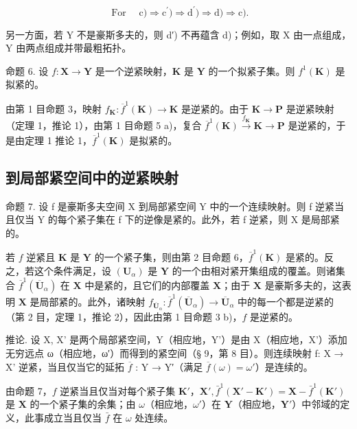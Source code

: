 \[
\text { For } \quad \mathrm{c}) \Longrightarrow \mathrm{c} ^ {\prime}) \Longrightarrow \mathrm{d} ^ {\prime}) \Longrightarrow \mathrm{d}) \Longrightarrow \mathrm{c}).
\]

另一方面，若 Y 不是豪斯多夫的，则 d′) 不再蕴含 d)；例如，取 X 由一点组成，Y 由两点组成并带最粗拓扑。

命题 6. 设 \(f: \mathbf{X} \to \mathbf{Y}\) 是一个逆紧映射，\(\mathbf{K}\) 是 \(\mathbf{Y}\) 的一个拟紧子集。则 \(f^1(\mathbf{K})\) 是拟紧的。

由第 1 目命题 3，映射 \(f_{\mathbf{K}}: \overline{f}^{1}(\mathbf{K}) \to \mathbf{K}\) 是逆紧的。由于 \(\mathbf{K} \to \mathbf{P}\) 是逆紧映射（定理 1，推论 1），由第 1 目命题 5 a)，复合 \(\overline{f}^{1}(\mathbf{K}) \xrightarrow{f_{\mathbf{K}}} \mathbf{K} \to \mathbf{P}\) 是逆紧的，于是由定理 1 推论 1，\(\overline{f}^{1}(\mathbf{K})\) 是拟紧的。

\subsection{到局部紧空间中的逆紧映射}

命题 7. 设 f 是豪斯多夫空间 X 到局部紧空间 Y 中的一个连续映射。则 f 逆紧当且仅当 Y 的每个紧子集在 f 下的逆像是紧的。此外，若 f 逆紧，则 X 是局部紧的。

若 \(f\) 逆紧且 \(\mathbf{K}\) 是 \(\mathbf{Y}\) 的一个紧子集，则由第 2 目命题 6，\(\overline{f}^{1}(\mathbf{K})\) 是紧的。反之，若这个条件满足，设 \((\mathbf{U}_{\alpha})\) 是 \(\mathbf{Y}\) 的一个由相对紧开集组成的覆盖。则诸集合 \(\overline{f}^{1}(\overline{\mathbf{U}}_{\alpha})\) 在 \(\mathbf{X}\) 中是紧的，且它们的内部覆盖 \(\mathbf{X}\)；由于 \(\mathbf{X}\) 是豪斯多夫的，这表明 \(\mathbf{X}\) 是局部紧的。此外，诸映射 \(f_{\overline{\mathbf{U}}_{\alpha}}: \overline{f}^{1}(\overline{\mathbf{U}}_{\alpha}) \to \overline{\mathbf{U}}_{\alpha}\) 中的每一个都是逆紧的（第 2 目，定理 1，推论 2），因此由第 1 目命题 3 b)，\(f\) 是逆紧的。

推论. 设 X, X' 是两个局部紧空间，Y（相应地，Y'）是由 X（相应地，X'）添加无穷远点 ω（相应地，ω′）而得到的紧空间（§ 9，第 8 目）。则连续映射 f: X → X' 逆紧，当且仅当它的延拓 \(\overline{f}\) : Y → Y′（满足 \(\overline{f}(\omega) = \omega'\)）是连续的。

由命题 7，\(f\) 逆紧当且仅当对每个紧子集 \(\mathbf{K}'\)，\(\mathbf{X}', \bar{f}^1(\mathbf{X}' - \mathbf{K}') = \mathbf{X} - \bar{f}^1(\mathbf{K}')\) 是 \(\mathbf{X}\) 的一个紧子集的余集；由 \(\omega\)（相应地，\(\omega'\)）在 \(\mathbf{Y}\)（相应地，\(\mathbf{Y}'\)）中邻域的定义，此事成立当且仅当 \(\bar{f}\) 在 \(\omega\) 处连续。


